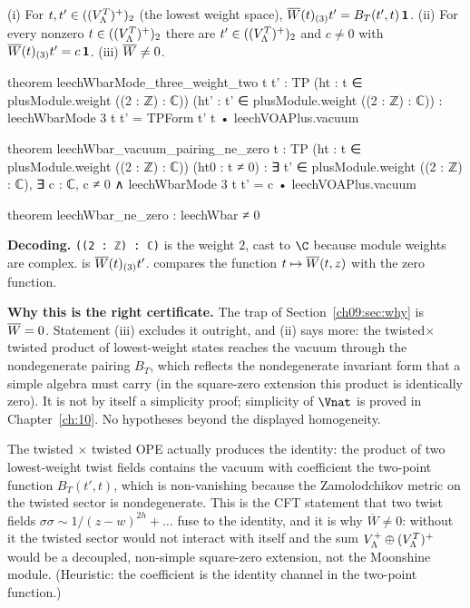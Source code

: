 \begin{theorem}\label{ch09:thm:nonzero}
\textup{(i)} For $t,t'\in((V_{\Lambda}^{T})^{+})_2$ (the lowest weight space),
$\overline{W}(t)_{(3)}t'=B_T(t',t)\,\mathbf1$.
\textup{(ii)} For every nonzero $t\in((V_{\Lambda}^{T})^{+})_2$ there are $t'\in((V_{\Lambda}^{T})^{+})_2$ and $c\neq0$ with
$\overline{W}(t)_{(3)}t'=c\,\mathbf1$.
\textup{(iii)} $\overline{W}\neq0$.
\end{theorem}
\begin{leancode}
theorem leechWbarMode_three_weight_two {t t' : TP} (ht : t ∈ plusModule.weight ((2 : ℤ) : ℂ))
    (ht' : t' ∈ plusModule.weight ((2 : ℤ) : ℂ)) :
    leechWbarMode 3 t t' = TPForm t' t • leechVOAPlus.vacuum

theorem leechWbar_vacuum_pairing_ne_zero {t : TP} (ht : t ∈ plusModule.weight ((2 : ℤ) : ℂ))
    (ht0 : t ≠ 0) :
    ∃ t' ∈ plusModule.weight ((2 : ℤ) : ℂ), ∃ c : ℂ, c ≠ 0 ∧
      leechWbarMode 3 t t' = c • leechVOAPlus.vacuum

theorem leechWbar_ne_zero : leechWbar ≠ 0
\end{leancode}
\begin{dictionary}
\textbf{Decoding.} \texttt{((2 : ℤ) : ℂ)} is the weight $2$, cast to $\C$ because module weights are
complex.  is $\overline{W}(t)_{(3)}t'$.  compares the
function $t\mapsto\overline{W}(t,z)$ with the zero function.

\textbf{Why this is the right certificate.} The trap of Section~\ref{ch09:sec:why} is
$\overline{W}=0$. Statement (iii) excludes it outright, and (ii) says more: the twisted$\times$twisted
product of lowest-weight states reaches the vacuum through the nondegenerate pairing $B_T$, which
reflects the nondegenerate invariant form that a simple algebra must carry (in the square-zero
extension this product is identically zero). It is not by itself a simplicity proof; simplicity of $\Vnat$ is
proved in Chapter~\ref{ch:10}. No hypotheses beyond the displayed homogeneity.
\end{dictionary}
\begin{physics}
The twisted $\times$ twisted OPE actually produces the identity: the product of two lowest-weight twist fields contains the vacuum with coefficient the two-point function $B_T(t',t)$, which is non-vanishing because the Zamolodchikov metric on the twisted sector is nondegenerate. This is the CFT statement that two twist fields $\sigma\sigma\sim1/(z-w)^{2h}+\dots$ fuse to the identity, and it is why $\overline W\neq0$: without it the twisted sector would not interact with itself and the sum $V_{\Lambda}^{+}\oplus(V_{\Lambda}^{T})^{+}$ would be a decoupled, non-simple square-zero extension, not the Moonshine module. (Heuristic: the coefficient is the identity channel in the two-point function.)
\end{physics}

